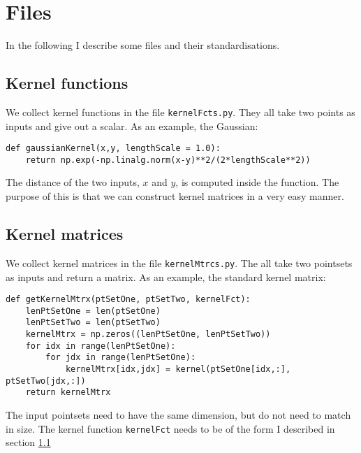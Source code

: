 \documentclass[11pt]{article}
\begin{document}
\section{Files}

In the following I describe some files and their standardisations.



\subsection{Kernel functions}
	\label{sec:kernelFct}
We collect kernel functions in the file \texttt{kernelFcts.py}. They all take two points as inputs and give out a scalar. As an example, the Gaussian:
\begin{Verbatim}[formatcom=\color{blue!50!black}]
def gaussianKernel(x,y, lengthScale = 1.0):
    return np.exp(-np.linalg.norm(x-y)**2/(2*lengthScale**2))
\end{Verbatim}

The distance of the two inputs, $x$ and $y$, is computed inside the function. The purpose of this is that we can construct kernel matrices in a very easy manner. 

\subsection{Kernel matrices}
We collect kernel matrices in the file \texttt{kernelMtrcs.py}. The all take two pointsets as inputs and return a matrix. As an example, the standard kernel matrix: 
\begin{Verbatim}[formatcom=\color{blue!50!black}]
def getKernelMtrx(ptSetOne, ptSetTwo, kernelFct):
    lenPtSetOne = len(ptSetOne)
    lenPtSetTwo = len(ptSetTwo)
    kernelMtrx = np.zeros((lenPtSetOne, lenPtSetTwo))
    for idx in range(lenPtSetOne):
        for jdx in range(lenPtSetOne):
            kernelMtrx[idx,jdx] = kernel(ptSetOne[idx,:], ptSetTwo[jdx,:])
    return kernelMtrx
\end{Verbatim}

The input pointsets need to have the same dimension, but do not need to match in size. The kernel function \texttt{kernelFct} needs to be of the form I described in section \ref{sec:kernelFct}
\end{document}
